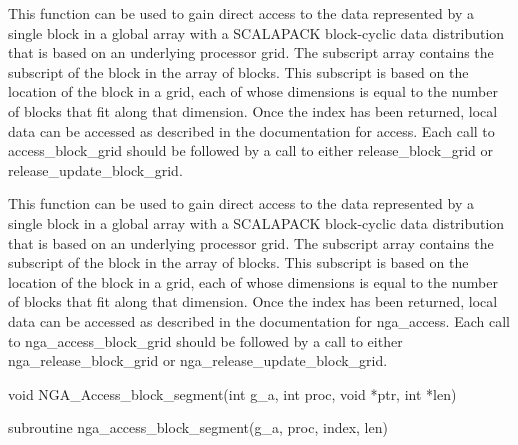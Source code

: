 \documentclass[12pt]{article}
\begin{document}
\begin{pydesc}
This function can be used to gain direct access to the data represented by a
single block in a global array with a SCALAPACK block-cyclic data distribution
that is based on an underlying processor grid. The subscript array contains the
subscript of the block in the array of blocks. This subscript is based on the
location of the block in a grid, each of whose dimensions is equal to the
number of blocks that fit along that dimension. Once the index has been
returned, local data can be accessed as described in the documentation for
access. Each call to access_block_grid should be followed by a call to
either release_block_grid or release_update_block_grid.
\end{pydesc}

\begin{fdesc}
This function can be used to gain direct access to the data represented by a
single block in a global array with a SCALAPACK block-cyclic data distribution
that is based on an underlying processor grid. The subscript array contains the
subscript of the block in the array of blocks. This subscript is based on the
location of the block in a grid, each of whose dimensions is equal to the
number of blocks that fit along that dimension. Once the index has been
returned, local data can be accessed as described in the documentation for
nga_access. Each call to nga_access_block_grid should be followed by a call to
either nga_release_block_grid or nga_release_update_block_grid.
\end{fdesc}



\begin{capi}
\begin{ccode}
void NGA_Access_block_segment(int g_a, int proc, void *ptr, int *len)
\end{ccode}
\begin{funcargs}
\end{funcargs}
\end{capi}

\begin{fapi}
\begin{fcode}
subroutine nga_access_block_segment(g_a, proc, index, len)
\end{fcode}
\begin{funcargs}
\end{funcargs}
\end{fapi}
\end{document}
